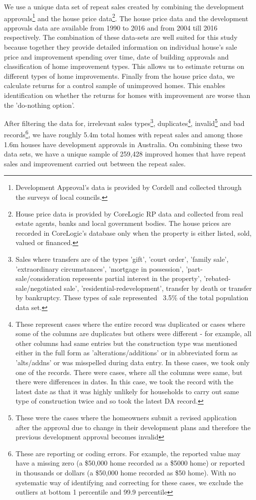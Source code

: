 \documentclass{article}
\begin{document}
We use a unique data set of repeat sales created by combining the development approvals\footnote{Development Approval's data is provided by Cordell and collected through the surveys of local councils.} and the house price data\footnote{House price data is provided by CoreLogic RP data and collected from real estate agents, banks and local government bodies. The house prices are recorded in CoreLogic's database only when the property is either listed, sold, valued or financed.}. The house price data and the development approvals data are available from 1990 to 2016 and from 2004 till 2016 respectively. The combination of these data-sets are well suited for this study because together they provide detailed information on individual house's sale price and improvement spending over time, date of building approvals and classification of home improvement types. This allows us to estimate returns on different types of home improvements. Finally from the house price data, we calculate returns for a control sample of unimproved homes. This enables identification on whether the returns for homes with improvement are worse than the 'do-nothing option'.
            
After filtering the data for, irrelevant sales types\footnote{Sales where transfers are of the types 'gift', 'court order', 'family sale', 'extraordinary circumstances', 'mortgage in possession', 'part-sale/consideration represents partial interest in the property', 'rebated-sale/negotiated sale', 'residential-redevelopment', transfer by death or transfer by bankruptcy. These types of sale represented ~3.5\% of the total population data set.}, duplicates\footnote{These represent cases where the entire record was duplicated or cases where some of the columns are duplicates but others were different - for example, all other columns had same entries but the construction type was mentioned either in the full form as 'alterations/additions' or in abbreviated form  as 'alts/addns' or was misspelled during data entry. In these cases, we took only one of the records. There were cases, where all the columns were same, but there were differences in dates. In this case, we took the record with the latest date as that it was highly unlikely for households to carry out same type of construction twice and so took the latest DA record.}, invalid\footnote{These were the cases where the homeowners submit a revised application after the approval due to change in their development plans and therefore the previous development approval becomes invalid} and bad records\footnote{These are reporting or coding errors. For example, the reported value may have a missing zero (a \$50,000 home recorded as a \$5000 home) or reported in thousands or dollars (a \$50,000 home recorded as \$50 home). With no systematic way of identifying and correcting for these cases, we exclude the outliers at bottom 1 percentile and 99.9 percentile}, we have roughly 5.4m total homes with repeat sales and among those 1.6m houses have development approvals in Australia. On combining these two data sets, we have a unique sample of 259,428 improved homes that have repeat sales and improvement carried out between the repeat sales. 
\end{document}
